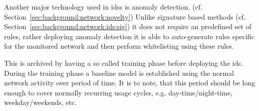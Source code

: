 Another major technology used in \glspl{ids} is anomaly detection. (cf. Section~\ref{sec:background:network:novelty})
Unlike signature based methods (cf. Section~\ref{sec:background:network:ids:sig}) it does not require an predefined set of rules, rather deploying anomaly detection it is able to auto-generate rules specific for the monitored network and then perform whitelisting using these rules.

This is archived by having a so called training phase before deploying the \gls{ids}. During the training phase a baseline model is established using the normal network activity over period of time. It is to note, that this period should be long enough to cover normally recurring usage cycles, e.g. day-time/night-time, weekday/weekends, etc.

